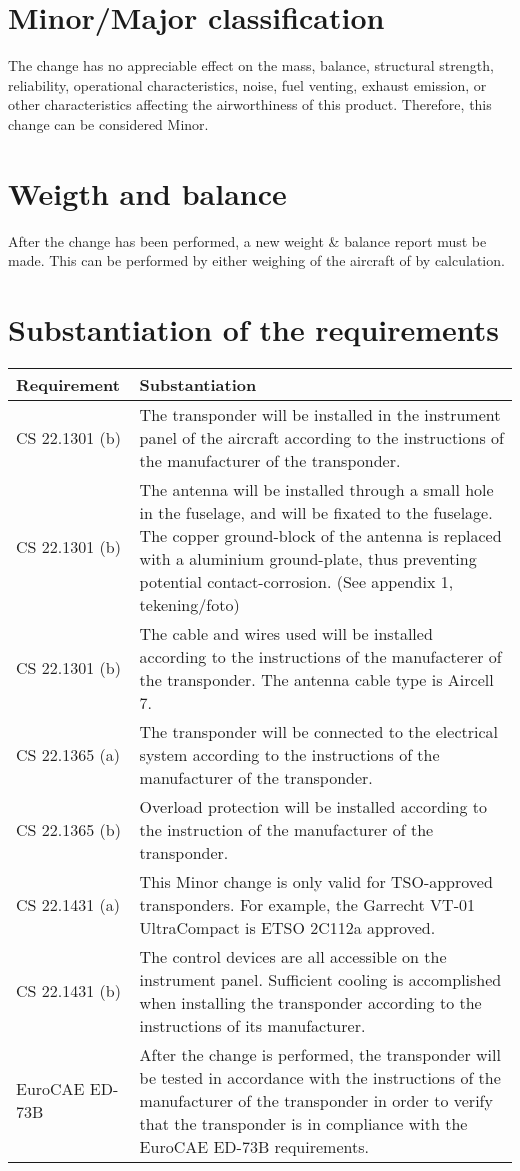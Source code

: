\documentclass{article}
\begin{document}
\section{Minor/Major classification}
The change has no appreciable effect on the mass, balance, structural strength, reliability, operational characteristics, noise, fuel venting, exhaust emission, or other characteristics affecting the airworthiness of this product. Therefore, this change can be considered Minor.

\section{Weigth and balance}
After the change has been performed, a new weight \& balance report must be made. This can be performed by either weighing of the aircraft of by calculation.

\section{Substantiation of the requirements}
\begin{tabular}{|l|p{10cm}|}
\hline
Requirement & Substantiation \\
\hline
CS 22.1301 (b) & The transponder will be installed in the instrument panel of the aircraft according to the instructions of the manufacturer of the transponder. \\
\hline
CS 22.1301 (b) & The antenna will be installed through a small hole in the fuselage, and will be fixated to the fuselage. The copper ground-block of the antenna is replaced with a aluminium ground-plate, thus preventing potential contact-corrosion. (See appendix 1, tekening/foto) \\
\hline
CS 22.1301 (b) & The cable and wires used will be installed according to the instructions of the manufacterer of the transponder. The antenna cable type is Aircell 7. \\
\hline
CS 22.1365 (a) & The transponder will be connected to the electrical system according to the instructions of the manufacturer of the transponder. \\
\hline
CS 22.1365 (b) & Overload protection will be installed according to the instruction of the manufacturer of the transponder. \\
\hline
CS 22.1431 (a) & This Minor change is only valid for TSO-approved transponders. For example, the Garrecht VT-01 UltraCompact is ETSO 2C112a approved. \\
\hline
CS 22.1431 (b) & The control devices are all accessible on the instrument panel. Sufficient cooling is accomplished when installing the transponder according to the instructions of its manufacturer. \\
\hline
EuroCAE ED-73B & After the change is performed, the transponder will be tested in accordance with the instructions of the manufacturer of the transponder in order to verify that the transponder is in compliance with the EuroCAE ED-73B requirements. \\
\hline
\end{tabular}
\end{document}
